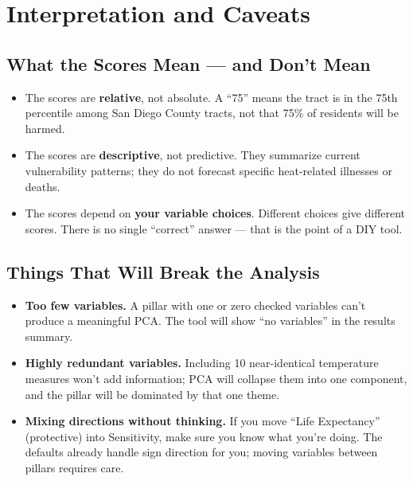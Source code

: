 \documentclass[11pt]{article}
\begin{document}
\section{Interpretation and Caveats}

\subsection{What the Scores Mean --- and Don't Mean}

\begin{itemize}[leftmargin=*]
  \item The scores are \textbf{relative}, not absolute. A ``75'' means
        the tract is in the 75th percentile among San Diego County tracts,
        not that 75\% of residents will be harmed.
  \item The scores are \textbf{descriptive}, not predictive. They
        summarize current vulnerability patterns; they do not forecast
        specific heat-related illnesses or deaths.
  \item The scores depend on \textbf{your variable choices}. Different
        choices give different scores. There is no single ``correct''
        answer --- that is the point of a DIY tool.
\end{itemize}

\subsection{Things That Will Break the Analysis}

\begin{itemize}[leftmargin=*]
  \item \textbf{Too few variables.} A pillar with one or zero checked
        variables can't produce a meaningful PCA. The tool will show
        ``no variables'' in the results summary.
  \item \textbf{Highly redundant variables.} Including 10 near-identical
        temperature measures won't add information; PCA will collapse them
        into one component, and the pillar will be dominated by that one
        theme.
  \item \textbf{Mixing directions without thinking.} If you move
        ``Life Expectancy'' (protective) into Sensitivity, make sure you
        know what you're doing. The defaults already handle sign
        direction for you; moving variables between pillars requires care.
\end{itemize}
\end{document}

